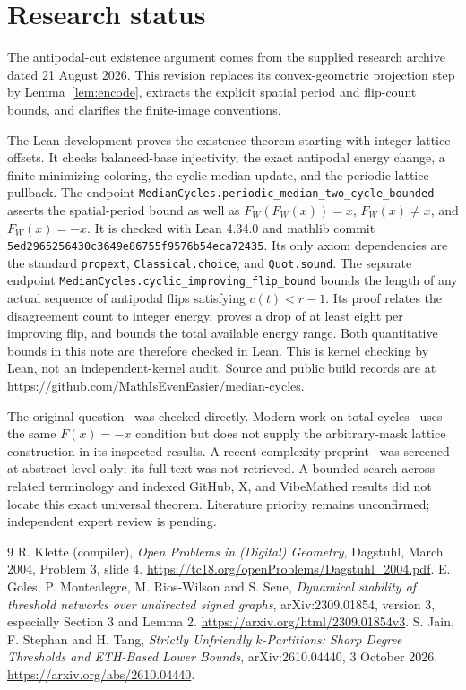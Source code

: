 \documentclass[11pt]{article}
\begin{document}
\section{Research status}
The antipodal-cut existence argument comes from the supplied research
archive dated 21 August 2026. This revision replaces its convex-geometric
projection step by Lemma~\ref{lem:encode}, extracts the explicit spatial
period and flip-count bounds, and clarifies the finite-image conventions.

The Lean development proves the existence theorem
starting with integer-lattice offsets. It checks balanced-base injectivity,
the exact antipodal energy change, a finite minimizing coloring, the cyclic
median update, and the periodic lattice pullback. The endpoint
\texttt{MedianCycles.periodic\_median\_two\_cycle\_bounded} asserts the
spatial-period bound as well as
$F_W(F_W(x))=x$, $F_W(x)\ne x$, and $F_W(x)=-x$.
It is checked with Lean 4.34.0 and mathlib commit
\texttt{5ed2965256430c3649e86755f9576b54eca72435}.
Its only axiom dependencies are the standard \texttt{propext},
\texttt{Classical.choice}, and \texttt{Quot.sound}.
The separate endpoint
\texttt{MedianCycles.cyclic\_improving\_flip\_bound} bounds the length of
any actual sequence of antipodal flips satisfying $c(t)<r-1$. Its proof
relates the disagreement count to integer energy, proves a drop of at
least eight per improving flip, and bounds the total available energy
range. Both quantitative bounds in this note are therefore checked in Lean.
This is kernel checking by Lean,
not an independent-kernel audit. Source and public build records are at
\url{https://github.com/MathIsEvenEasier/median-cycles}.

The original question~\cite{klette} was checked directly. Modern work on
total cycles~\cite{goles} uses the same $F(x)=-x$ condition but does not
supply the arbitrary-mask lattice construction in its inspected results.
A recent complexity preprint~\cite{jain} was screened at abstract level
only; its full text was not retrieved. A bounded search across related
terminology and indexed GitHub, X, and VibeMathed results did not locate
this exact universal theorem. Literature priority remains unconfirmed;
independent expert review is pending.

\begin{thebibliography}{9}
 R. Klette (compiler), \emph{Open Problems in (Digital)
Geometry}, Dagstuhl, March 2004, Problem 3, slide 4.
\url{https://tc18.org/openProblems/Dagstuhl_2004.pdf}.
 E. Goles, P. Montealegre, M. Rios-Wilson and S. Sene,
\emph{Dynamical stability of threshold networks over undirected signed
graphs}, arXiv:2309.01854, version 3, especially Section 3 and Lemma 2.
\url{https://arxiv.org/html/2309.01854v3}.
 S. Jain, F. Stephan and H. Tang,
\emph{Strictly Unfriendly $k$-Partitions: Sharp Degree Thresholds and
ETH-Based Lower Bounds}, arXiv:2610.04440, 3 October 2026.
\url{https://arxiv.org/abs/2610.04440}.
\end{thebibliography}
\end{document}
